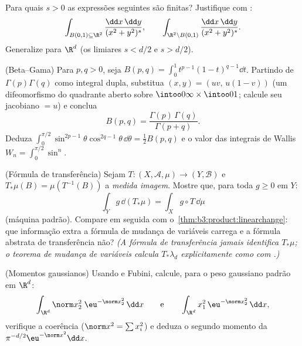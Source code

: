 \begin{exercise}[$\star\star$]\label{exo:b3:product:7}
Para quais $s > 0$ as expressões seguintes são finitas? Justifique
com :
\[
\int_{B(0,1)\subseteq\R^2}\frac{\dd x\,\dd y}{(x^2 +
y^2)^{s}},
\qquad
\int_{\R^2\setminus B(0,1)}\frac{\dd x\,\dd y}{(x^2 +
y^2)^{s}} .
\]
Generalize para $\R^d$ (os limiares $s < d/2$ e $s > d/2$).
\end{exercise}

\begin{exercise}[$\star\star\star$]\label{exo:b3:product:8}
(Beta--Gama) Para $p, q > 0$, seja $B(p, q) = \int_0^1t^{p-1}(1
- t)^{q-1}\dd t$. Partindo de $\Gamma(p)\Gamma(q)$ como integral
dupla, substitua $(x, y) = (uv,\, u(1 - v))$ (um difeomorfismo do quadrante aberto sobre
$\intoo0\infty\times\intoo01$; calcule seu jacobiano $= u$) e conclua
\[
B(p, q) = \frac{\Gamma(p)\,\Gamma(q)}{\Gamma(p + q)} .
\]
Deduza $\int_0^{\pi/2}\sin^{2p-1}\theta\cos^{2q-1}\theta\,
\dd\theta = \frac12B(p,q)$ e o valor das integrais de Wallis $W_n = \int_0^{\pi/2}\sin^n$.
\end{exercise}

\begin{exercise}[$\star\star$]\label{exo:b3:product:9}
(Fórmula de transferência) Sejam $T \colon (X, \mathcal A, \mu) \to (Y,
\mathcal B)$  e $T_*\mu(B) = \mu(T^{-1}(B))$ a \emph{medida
imagem}. Mostre que, para toda $g \geq 0$  em
$Y$:
\[
\int_Y g\,\dd(T_*\mu) = \int_X g\circ T\,\dd\mu
\]
(máquina padrão). Compare em seguida com o~\cref{thm:b3:product:linearchange}: que
informação extra a fórmula de mudança de variáveis carrega e a fórmula
abstrata de transferência não? \emph{(A fórmula de transferência jamais
identifica $T_*\mu$; o teorema de mudança de variáveis calcula $T_*\lambda_d$
explicitamente como  com .)}
\end{exercise}

\begin{exercise}[$\star\star\star$]\label{exo:b3:product:10}
(Momentos gaussianos) Usando  e Fubini, calcule,
para o peso gaussiano padrão em $\R^d$:
\[
\int_{\R^d}\norm x_2^2\;\eu^{-\norm x_2^2}\,\dd x
\qquad\text{e}\qquad
\int_{\R^d}x_1^2\,\eu^{-\norm x^2_2}\,\dd x,
\]
verifique a coerência ($\norm x^2 = \sum x_i^2$) e deduza o segundo momento da 
$\pi^{-d/2}\eu^{-\norm x^2}\dd x$.
\end{exercise}

